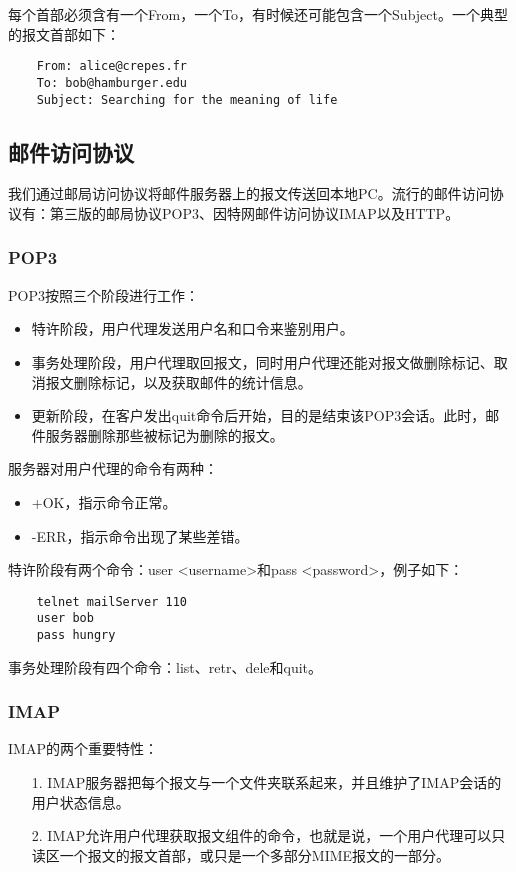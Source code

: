 \documentclass[a4paper,left=2.5cm,right=2.5cm,11pt]{article}
\begin{document}
	每个首部必须含有一个From，一个To，有时候还可能包含一个Subject。一个典型的报文首部如下：
	\begin{lstlisting}
	From: alice@crepes.fr
	To: bob@hamburger.edu
	Subject: Searching for the meaning of life
	\end{lstlisting}

\subsection{邮件访问协议}
	我们通过邮局访问协议将邮件服务器上的报文传送回本地PC。流行的邮件访问协议有：第三版的邮局协议POP3、因特网邮件访问协议IMAP以及HTTP。

\subsubsection{POP3}
	POP3按照三个阶段进行工作：
	\begin{itemize}
		\item 特许阶段，用户代理发送用户名和口令来鉴别用户。
		\item 事务处理阶段，用户代理取回报文，同时用户代理还能对报文做删除标记、取消报文删除标记，以及获取邮件的统计信息。
		\item 更新阶段，在客户发出quit命令后开始，目的是结束该POP3会话。此时，邮件服务器删除那些被标记为删除的报文。
	\end{itemize}

	服务器对用户代理的命令有两种：
	\begin{itemize}
		\item +OK，指示命令正常。
		\item -ERR，指示命令出现了某些差错。
	\end{itemize}

	特许阶段有两个命令：user <username>和pass <password>，例子如下：
	\begin{lstlisting}
	telnet mailServer 110
	user bob
	pass hungry
	\end{lstlisting}

	事务处理阶段有四个命令：list、retr、dele和quit。

\subsubsection{IMAP}
	IMAP的两个重要特性：
	\begin{itemize}
		\item[1.] IMAP服务器把每个报文与一个文件夹联系起来，并且维护了IMAP会话的用户状态信息。
		\item[2.] IMAP允许用户代理获取报文组件的命令，也就是说，一个用户代理可以只读区一个报文的报文首部，或只是一个多部分MIME报文的一部分。
	\end{itemize}
\end{document}
